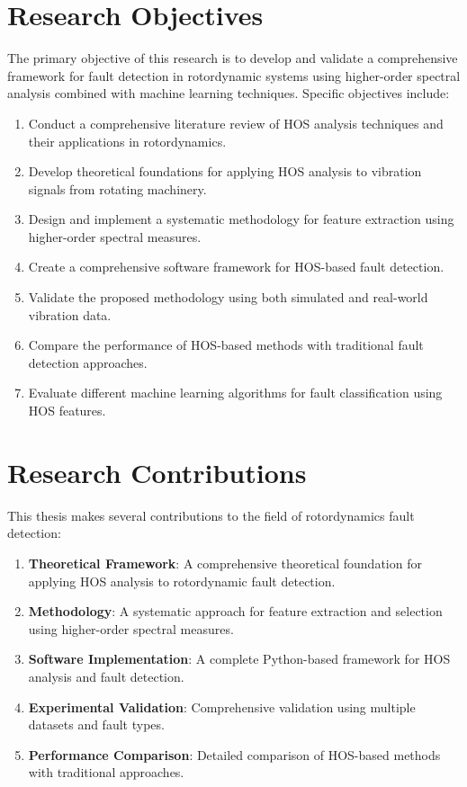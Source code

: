 \section{Research Objectives}

The primary objective of this research is to develop and validate a comprehensive framework for fault detection in rotordynamic systems using higher-order spectral analysis combined with machine learning techniques. Specific objectives include:

\begin{enumerate}
    \item Conduct a comprehensive literature review of HOS analysis techniques and their applications in rotordynamics.
    \item Develop theoretical foundations for applying HOS analysis to vibration signals from rotating machinery.
    \item Design and implement a systematic methodology for feature extraction using higher-order spectral measures.
    \item Create a comprehensive software framework for HOS-based fault detection.
    \item Validate the proposed methodology using both simulated and real-world vibration data.
    \item Compare the performance of HOS-based methods with traditional fault detection approaches.
    \item Evaluate different machine learning algorithms for fault classification using HOS features.
\end{enumerate}

\section{Research Contributions}

This thesis makes several contributions to the field of rotordynamics fault detection:

\begin{enumerate}
    \item \textbf{Theoretical Framework}: A comprehensive theoretical foundation for applying HOS analysis to rotordynamic fault detection.
    \item \textbf{Methodology}: A systematic approach for feature extraction and selection using higher-order spectral measures.
    \item \textbf{Software Implementation}: A complete Python-based framework for HOS analysis and fault detection.
    \item \textbf{Experimental Validation}: Comprehensive validation using multiple datasets and fault types.
    \item \textbf{Performance Comparison}: Detailed comparison of HOS-based methods with traditional approaches.
\end{enumerate}

